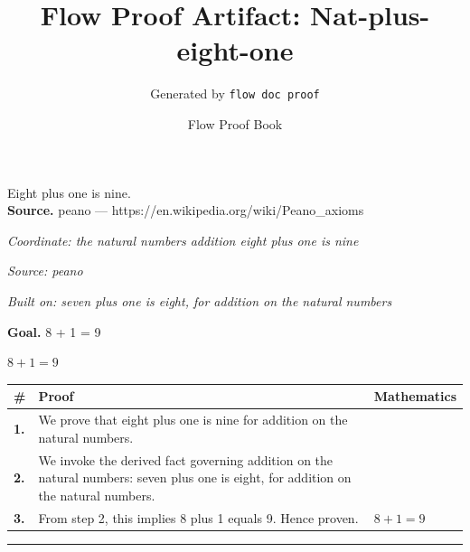 \documentclass[11pt]{article}
\title{Flow Proof Artifact: Nat-plus-eight-one}
\author{Generated by \texttt{flow doc proof}}
\date{Flow Proof Book}
\theoremstyle{definition}
\begin{document}
\maketitle
Eight plus one is nine.\\[0.5em]
\textbf{Source.} peano — https://en.wikipedia.org/wiki/Peano\_axioms\\[0.5em]
\bigskip
{}\par
\smallskip\noindent\textit{Coordinate: the natural numbers \cdot addition \cdot eight plus one is nine}\par
\smallskip\noindent\textit{Source: peano}\par
\smallskip\noindent\textit{Built on: seven plus one is eight, for addition on the natural numbers}\par
\medskip
\noindent\textbf{Goal.} 8 + 1 = 9\par
\noindent$\displaystyle 8 + 1 = 9$\par
\medskip
\noindent
\begin{tabular}{@{} >{\raggedright\arraybackslash}p{} >{\raggedright\arraybackslash}p{} >{\raggedleft\arraybackslash}p{} @{}}
\textbf{\#} & \textbf{Proof} & \textbf{Mathematics} \\
\midrule
\textbf{1.} & We prove that eight plus one is nine for addition on the natural numbers. & \\[0.45em]
\textbf{2.} & We invoke the derived fact governing addition on the natural numbers: seven plus one is eight, for addition on the natural numbers. & \\[0.45em]
\textbf{3.} & From step 2, this implies 8 plus 1 equals 9. Hence proven. & $\displaystyle 8 + 1 = 9$ \\[0.45em]
\bottomrule
\end{tabular}
\label{thm:Nat-addition-eight_plus_one_is_nine}
\par\medskip\hrule
\end{document}
